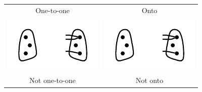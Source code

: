 \documentclass{amsart}
\newcommand{\lgap}{2pt}                             %
\newcommand{\llgap}{6pt}                            %
\begin{document}
\begin{table}
\begin{tabular}{ | c | c | }
   One-to-one                                & Onto \\[\lgap]
   \includegraphics{1441ab.pdf}              & \includegraphics{1441bb.pdf} \\[-10pt]
   Not one-to-one                            & Not onto \\[\llgap] \hline
\end{tabular}
\end{table}

\end{document}
